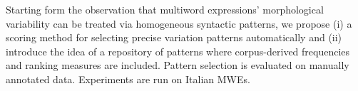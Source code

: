 Starting form the observation that multiword expressions' morphological variability can be treated via homogeneous syntactic patterns, we propose (i) a
 scoring method for selecting precise variation patterns automatically and (ii)
 introduce the idea of a repository of patterns where corpus-derived frequencies
 and ranking measures are included. Pattern selection is evaluated on manually
 annotated data. Experiments are run on Italian MWEs.

